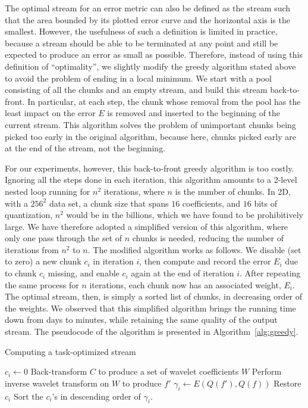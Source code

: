 The optimal stream for an error metric can also be defined as the stream such that the area bounded
by its plotted error curve and the horizontal axis is the smallest. However, the usefulness of such
a definition is limited in practice, because a stream should be able to be terminated at any point
and still be expected to produce an error as small as possible. Therefore, instead of using this
definition of ``optimality'', we slightly modify the greedy algorithm stated above to avoid the
problem of ending in a local minimum. We start with a pool consisting of all the chunks and an
empty stream, and build this stream back-to-front. In particular, at each step, the chunk whose
removal from the pool has the least impact on the error $E$ is removed and inserted to the beginning
of the current stream. This algorithm solves the problem of unimportant chunks being picked too
early in the original algorithm, because here, chunks picked early are at the end of the
stream, not the beginning.

For our experiments, however, this back-to-front greedy algorithm is too costly. Ignoring
all the steps done in each iteration, this algorithm amounts to a 2-level nested loop running for
$n^2$ iterations, where $n$ is the number of chunks. In 2D, with a $256^2$ data set, a chunk size
that spans $16$ coefficients, and $16$ bits of quantization, $n^2$ would be in the billions, which
we have found to be prohibitively large. We have therefore adopted a simplified version of this
algorithm, where only one pass through the set of $n$ chunks is needed, reducing the number of
iterations from $n^2$ to $n$. The modified algorithm works as follows. We disable (set to zero) a
new chunk $c_i$ in iteration $i$, then compute and record the error $E_i$ due to chunk $c_i$
missing, and enable $c_i$ again at the end of iteration $i$. After repeating the same process for
$n$ iterations, each chunk now has an associated weight, $E_i$. The optimal stream, then, is simply
a sorted list of chunks, in decreasing order of the weights. We observed that this simplified
algorithm brings the running time down from days to minutes, while retaining the same quality of the
output stream. The pseudocode of the algorithm is presented in Algorithm~\ref{alg:greedy}.

\begin{algorithm}[h]
  \caption{Computing a task-optimized stream}
  \begin{algorithmic}[1]
			\State $c_i \gets 0$
      \State Back-transform $C$ to produce a set of wavelet coefficients $W$
			\State Perform inverse wavelet transform on $W$ to produce $f'$
			\State $\gamma_i \gets E(Q(f'),Q(f))$			
			\State Restore $c_i$
		\EndFor
		\State Sort the $c_i$'s in descending order of $\gamma_i$.
	\end{algorithmic}
	\label{alg:greedy}
\end{algorithm}

